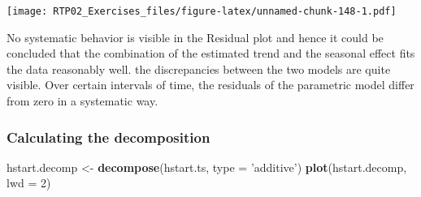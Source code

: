 \documentclass[
]{article}
\newenvironment{Shaded}{\begin{snugshade}}{\end{snugshade}}
\newcommand{\DataTypeTok}[1]{\textcolor[rgb]{0.13,0.29,0.53}{#1}}
\newcommand{\DecValTok}[1]{\textcolor[rgb]{0.00,0.00,0.81}{#1}}
\newcommand{\FloatTok}[1]{\textcolor[rgb]{0.00,0.00,0.81}{#1}}
\newcommand{\KeywordTok}[1]{\textcolor[rgb]{0.13,0.29,0.53}{\textbf{#1}}}
\newcommand{\NormalTok}[1]{#1}
\newcommand{\OperatorTok}[1]{\textcolor[rgb]{0.81,0.36,0.00}{\textbf{#1}}}
\newcommand{\StringTok}[1]{\textcolor[rgb]{0.31,0.60,0.02}{#1}}
\begin{document}
\begin{Shaded}
\end{Shaded}

\texttt{[image: RTP02\_Exercises\_files/figure-latex/unnamed-chunk-148-1.pdf]}

No systematic behavior is visible in the Residual plot and hence it
could be concluded that the combination of the estimated trend and the
seasonal effect fits the data reasonably well. the discrepancies between
the two models are quite visible. Over certain intervals of time, the
residuals of the parametric model differ from zero in a systematic way.

\hypertarget{calculating-the-decomposition}{%
\subsubsection{Calculating the
decomposition}\label{calculating-the-decomposition}}

\begin{Shaded}
\begin{Highlighting}[]
\NormalTok{hstart.decomp <-}\StringTok{ }\KeywordTok{decompose}\NormalTok{(hstart.ts, }\DataTypeTok{type =} \StringTok{'additive'}\NormalTok{)}
\KeywordTok{plot}\NormalTok{(hstart.decomp, }\DataTypeTok{lwd =} \DecValTok{2}\NormalTok{)}
\end{Highlighting}
\end{Shaded}
\end{document}
